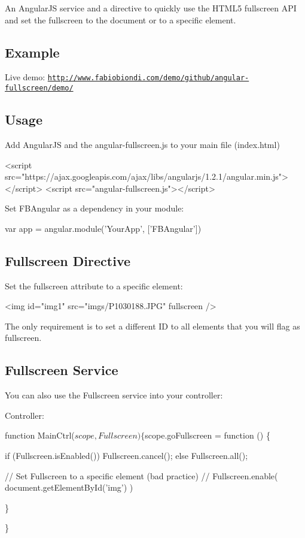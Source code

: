 An Angular\+JS service and a directive to quickly use the H\+T\+M\+L5 fullscreen A\+PI and set the fullscreen to the document or to a specific element.

\subsection*{Example}

Live demo\+: \href{http://www.fabiobiondi.com/demo/github/angular-fullscreen/demo/}{\tt http\+://www.\+fabiobiondi.\+com/demo/github/angular-\/fullscreen/demo/}

\subsection*{Usage}

Add Angular\+JS and the angular-\/fullscreen.\+js to your main file (index.\+html)


\begin{DoxyCode}
<script src="https://ajax.googleapis.com/ajax/libs/angularjs/1.2.1/angular.min.js"></script>
<script src="angular-fullscreen.js"></script>
\end{DoxyCode}


Set {\ttfamily F\+B\+Angular} as a dependency in your module\+:


\begin{DoxyCode}
var app = angular.module('YourApp', ['FBAngular'])
\end{DoxyCode}


\subsection*{Fullscreen Directive}

Set the {\ttfamily fullscreen} attribute to a specific element\+:


\begin{DoxyCode}
<img id="img1" src="imgs/P1030188.JPG" fullscreen />
\end{DoxyCode}
 The only requirement is to set a different ID to all elements that you will flag as {\ttfamily fullscreen}.

\subsection*{Fullscreen Service}

You can also use the {\ttfamily Fullscreen} service into your controller\+:

Controller\+: 
\begin{DoxyCode}
function MainCtrl($scope, Fullscreen) \{

   $scope.goFullscreen = function () \{

      if (Fullscreen.isEnabled())
         Fullscreen.cancel();
      else
         Fullscreen.all();

      // Set Fullscreen to a specific element (bad practice)
      // Fullscreen.enable( document.getElementById('img') )

   \}

\}
\end{DoxyCode}



